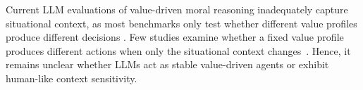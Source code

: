 \documentclass[11pt]{article}
\begin{document}

Current LLM evaluations of value-driven moral reasoning inadequately capture situational context, as most benchmarks only test whether different value profiles produce different decisions \citep{guo2026counterfactual, scherrer2023evaluating, jiao2025ai, mahajan2025mapping, schacht2025mapping}. Few studies examine whether a fixed value profile produces different actions when only the situational context changes~\citep{harry2026beyond, sauter2026between, backmann2025ethics}. Hence, it remains unclear whether LLMs act as stable value-driven agents or exhibit human-like context sensitivity.
\end{document}
